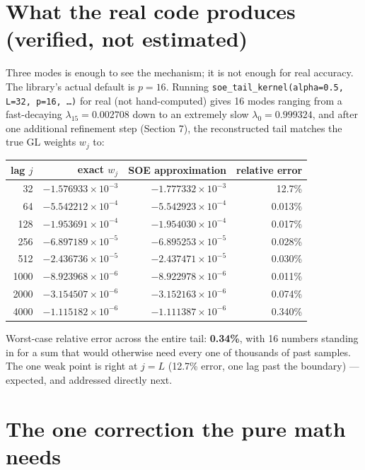 \documentclass[11pt]{article}
\begin{document}
\section{What the real code produces (verified, not estimated)}

Three modes is enough to see the mechanism; it is not enough for real accuracy. The library's actual default is $p=16$. Running \texttt{soe\_tail\_kernel(alpha=0.5, L=32, p=16, \ldots)} for real (not hand-computed) gives 16 modes ranging from a fast-decaying $\lambda_{15}=0.002708$ down to an extremely slow $\lambda_0 = 0.999324$, and after one additional refinement step (Section 7), the reconstructed tail matches the true GL weights $w_j$ to:

\begin{table}[h]
\centering
\small
\begin{tabular}{rrrr}
\toprule
lag $j$ & exact $w_j$ & SOE approximation & relative error \\
\midrule
32   & $-1.576933\times10^{-3}$ & $-1.777332\times10^{-3}$ & 12.7\% \\
64   & $-5.542212\times10^{-4}$ & $-5.542923\times10^{-4}$ & 0.013\% \\
128  & $-1.953691\times10^{-4}$ & $-1.954030\times10^{-4}$ & 0.017\% \\
256  & $-6.897189\times10^{-5}$ & $-6.895253\times10^{-5}$ & 0.028\% \\
512  & $-2.436736\times10^{-5}$ & $-2.437471\times10^{-5}$ & 0.030\% \\
1000 & $-8.923968\times10^{-6}$ & $-8.922978\times10^{-6}$ & 0.011\% \\
2000 & $-3.154507\times10^{-6}$ & $-3.152163\times10^{-6}$ & 0.074\% \\
4000 & $-1.115182\times10^{-6}$ & $-1.111387\times10^{-6}$ & 0.340\% \\
\bottomrule
\end{tabular}
\end{table}

Worst-case relative error across the entire tail: \textbf{0.34\%}, with 16 numbers standing in for a sum that would otherwise need every one of thousands of past samples. The one weak point is right at $j=L$ (12.7\% error, one lag past the boundary) --- expected, and addressed directly next.

\section{The one correction the pure math needs}
\end{document}
